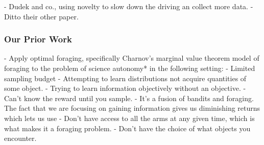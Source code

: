 	- Dudek and co., using novelty to slow down the driving an collect more data.
		- Ditto their other paper.

\subsubsection{Our Prior Work}
		- Apply optimal foraging, specifically Charnov's marginal value theorem
		model of foraging to the problem of science autonomy* in the following setting:	
			- Limited sampling budget
			- Attempting to learn distributions not acquire quantities of some object.
			- Trying to learn information objectively without an objective. 
			- Can't know the reward until you sample.
			- It's a fusion of bandits and foraging.  The fact that we are focusing on gaining information gives us diminishing returns which lets us use 
			- Don't have access to all the arms at any given time, which is what makes it a foraging problem.
			- Don't have the choice of what objects you encounter.

